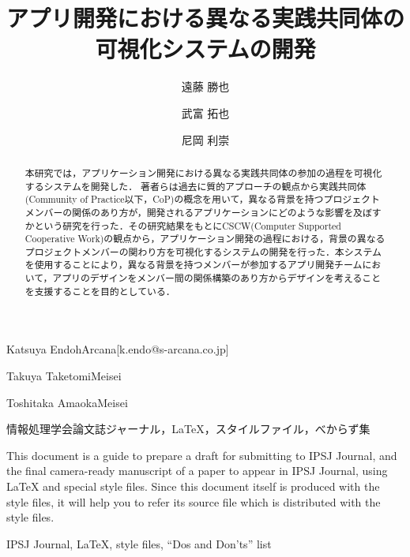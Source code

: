 \documentclass[submit,techrep]{ipsj}
\begin{document}
\title{アプリ開発における異なる実践共同体の\\
可視化システムの開発}




\author{遠藤 勝也}{Katsuya Endoh}{Arcana}[k.endo@s-arcana.co.jp]
\author{武富 拓也}{Takuya Taketomi}{Meisei}
\author{尼岡 利崇}{Toshitaka Amaoka}{Meisei}

\begin{abstract}
  本研究では，アプリケーション開発における異なる実践共同体の参加の過程を可視化するシステムを開発した．
著者らは過去に質的アプローチの観点から実践共同体(Community of Practice以下，CoP)の概念を用いて，異なる背景を持つプロジェクトメンバーの関係のあり方が，開発されるアプリケーションにどのような影響を及ぼすかという研究を行った．その研究結果をもとにCSCW(Computer Supported Cooperative Work)の観点から，アプリケーション開発の過程における，背景の異なるプロジェクトメンバーの関わり方を可視化するシステムの開発を行った．本システムを使用することにより，異なる背景を持つメンバーが参加するアプリ開発チームにおいて，アプリのデザインをメンバー間の関係構築のあり方からデザインを考えることを支援することを目的としている．
\end{abstract}


\begin{jkeyword}
情報処理学会論文誌ジャーナル，\LaTeX，スタイルファイル，べからず集
\end{jkeyword}

\begin{eabstract}
This document is a guide to prepare a draft for submitting to IPSJ
Journal, and the final camera-ready manuscript of a paper to appear in
IPSJ Journal, using {\LaTeX} and special style files.  Since this
document itself is produced with the style files, it will help you to
refer its source file which is distributed with the style files.
\end{eabstract}

\begin{ekeyword}
IPSJ Journal, \LaTeX, style files, ``Dos and Don'ts'' list
\end{ekeyword}
\end{document}

